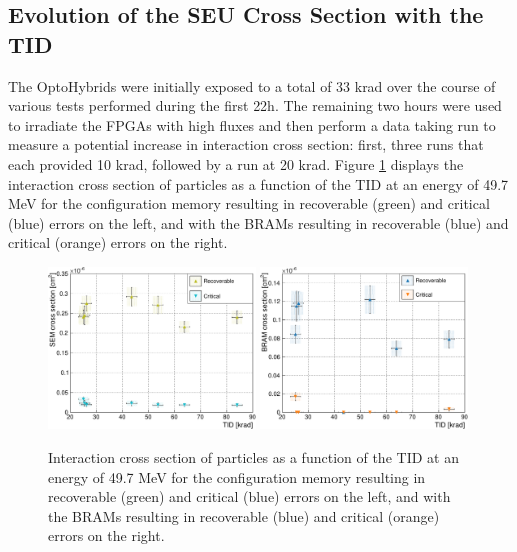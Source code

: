     \subsection{Evolution of the SEU Cross Section with the TID}

      The OptoHybrids were initially exposed to a total of 33 krad over the course of various tests performed during the first 22h. The remaining two hours were used to irradiate the FPGAs with high fluxes and then perform a data taking run to measure a potential increase in interaction cross section: first, three runs that each provided 10 krad, followed by a run at 20 krad. Figure \ref{fig:II-5-data-seu-tid} displays the interaction cross section of particles as a function of the TID at an energy of 49.7 MeV for the configuration memory resulting in recoverable (green) and critical (blue) errors on the left, and with the BRAMs resulting in recoverable (blue) and critical (orange) errors on the right. \\

      \begin{figure}[h!]
        \centering
        \includegraphics[width=0.49\textwidth]{img/plots/cDose_SEM-crop}
        \includegraphics[width=0.49\textwidth]{img/plots/cDose_BRAM-crop}
        \caption{Interaction cross section of particles as a function of the TID at an energy of 49.7 MeV for the configuration memory resulting in recoverable (green) and critical (blue) errors on the left, and with the BRAMs resulting in recoverable (blue) and critical (orange) errors on the right.}
        \label{fig:II-5-data-seu-tid}
      \end{figure}

